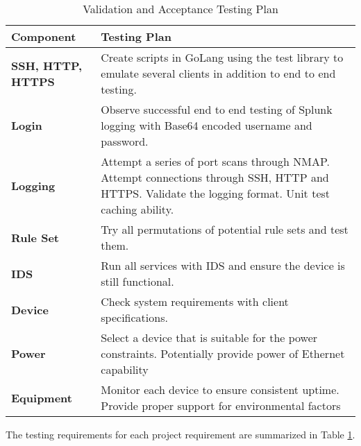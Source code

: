 \begin{table}
\renewcommand{\arraystretch}{1.5}
\centering
\begin{tabular}{l | p{10cm}}
\textup{\Large {\bf Component}} & \textup{\Large {\bf Testing Plan}} \\
\hline \hline
\textbf{SSH, HTTP, HTTPS} & Create scripts in GoLang using the test library to emulate several clients in addition to end to end testing. \\
\textbf{Login} & Observe successful end to end testing of Splunk logging with Base64 encoded username and password.\\
\textbf{Logging} & Attempt a series of port scans through NMAP. Attempt connections through SSH, HTTP and HTTPS. Validate the logging format. Unit test caching ability.  \\
\textbf{Rule Set} & Try all permutations of potential rule sets and test them. \\
\textbf{IDS} & Run all services with IDS and ensure the device is still functional. \\
\textbf{Device} & Check system requirements with client specifications. \\
\textbf{Power} & Select a device that is suitable for the power constraints.  Potentially provide power of Ethernet capability \\
\textbf{Equipment} & Monitor each device to ensure consistent uptime. Provide proper support for environmental factors\\
\end{tabular}
\caption{Validation and Acceptance Testing Plan}
\label{table:vatest}
\end{table}

The testing requirements for each project requirement are summarized in
Table \ref{table:vatest}.
